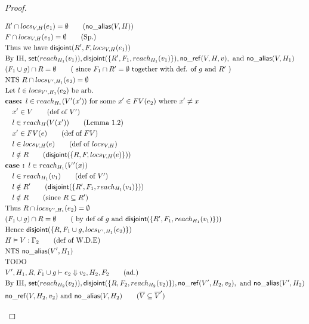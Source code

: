 \documentclass[11pt]{article}
\newcommand{\ms}[1]{\ensuremath{\mathsf{#1}}}
\newcommand{\na}[1]{\mathsf{no\_alias}(#1)}
\newcommand{\nr}[1]{\mathsf{no\_ref}(#1)}
\newcommand{\dist}[1]{\mathsf{disjoint}(#1)}
\begin{document}
\begin{proof}
\begin{description}
\begin{align*}
  &R' \cap locs_{V,H}(e_1) = \emptyset \tag{$\na{V,H}$}\\
  &F \cap locs_{V,H}(e_1) = \emptyset \tag{Sp.}\\
  &\text{Thus we have } \dist{R',F,locs_{V,H}(e_1)}\\
  &\text{By IH, } \ms{set}(reach_{H_1}(v_1)), \dist{\{R',F_1,reach_{H_1}(v_1)\}}, \nr{V,H,v},\text{ and } \na{V,H_1}\\
  &(F_1 \cup g) \cap R = \emptyset \tag{ since  $F_1 \cap R' = \emptyset$ together with def. of $g$ and $R'$ }\\
  &\text{NTS } R \cap locs_{V',H_1}(e_2) = \emptyset\\
  &\text{Let } l \in locs_{V',H_1}(e_2) \text{ be arb.}\\
  &\textbf{case: } l \in reach_{H_1}(V'(x')) \text{ for some $x' \in FV(e_2)$ where } x' \ne x\\
  &\quad x' \in V \tag{def of $V'$}\\
  &\quad l \in reach_{H}(V(x')) \tag{Lemma 1.2}\\
  &\quad x' \in FV(e) \tag{def of $FV$}\\
  &\quad l \in locs_{V,H}(e) \tag{def of $locs_{V,H}$}\\
  &\quad l \notin R \tag{$\dist{\{R,F,locs_{V,H}(e)\}}$}\\
  &\textbf{case : } l \in reach_{H_1}(V'(x))\\
  &\quad l \in reach_{H_1}(v_1) \tag{def of $V'$}\\
  &\quad l \notin R' \tag{$\dist{\{R',F_1,reach_{H_1}(v_1)\}}$}\\
  &\quad l \notin R \tag{since  $R \subseteq R'$}\\
  &\text{Thus }  R \cap locs_{V',H_1}(e_2) = \emptyset\\
  &(F_1 \cup  g) \cap R = \emptyset \tag{ by def of  $g$ and  $\dist{\{R',F_1,reach_{H_1}(v_1)\}}$}\\
  &\text{Hence } \dist{\{R, F_1 \cup g, locs_{V',H_1}(e_2)\}}\\
  &H \vDash V : \Gamma_2 \tag{def of W.D.E}\\
  &\text{NTS } \na{V',H_1}\\
  &\text{TODO}\\
  &V',H_1,R, F_1 \cup g \vdash e_2 \Downarrow v_2,H_2,F_2 \tag{ad.}\\
  &\text{By IH, } \ms{set}(reach_{H_2}(v_2)), \dist{\{R,F_2,reach_{H_2}(v_2)\}}, \nr{V',H_2,v_2},\text{ and } \na{V',H_2}\\
  &\nr{V,H_2,v_2} \text{ and } \na{V,H_2} \tag{$\overline V \subseteq \overline V'$}\\

\end{align*}
\end{description}
\end{proof}
\end{document}
